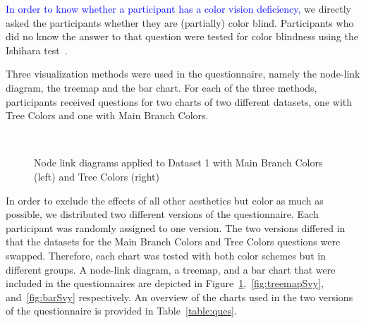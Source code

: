 \documentclass[review,journal]{vgtc}         %
\newcommand{\changedM}[1]{\textcolor{blue}{#1}}
\begin{document}
\changedM{In order to know whether 
a participant has a color vision deficiency,} we directly asked the participants 
whether they are (partially) color blind. Participants who did no know the answer
to that question were tested for 
color blindness using the Ishihara test~\cite{ishihara}. 

Three visualization methods were used in the questionnaire, namely the node-link diagram, the treemap and the bar chart. For each of the three methods, participants received questions for two charts of two different datasets, one with Tree Colors and one with Main Branch Colors. 

\begin{figure}[tb]
  \centering
  \mbox{
  }
  \caption{Node link diagrams applied to Dataset 1 with Main Branch Colors (left) and Tree Colors (right)}\label{fig:graphSvy}

\end{figure}

In order to exclude the effects of all other aesthetics but color as much as possible, we distributed two different versions of the questionnaire. Each participant was randomly assigned to one version. The two versions differed in that the datasets for the Main Branch Colors and Tree Colors questions were swapped. Therefore, each chart was tested with both color schemes but in different groups. A node-link diagram, a treemap, and a bar chart that were included in the questionnaires are depicted in Figure~\ref{fig:graphSvy},~\ref{fig:treemapSvy}, and~\ref{fig:barSvy} respectively. An overview of the charts used in the two versions of the questionnaire is provided in Table~\ref{table:ques}.
\end{document}
